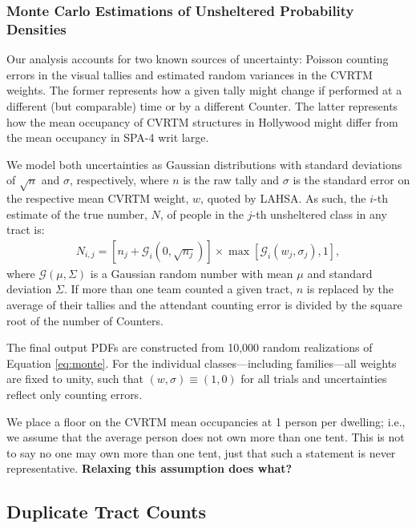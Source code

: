\documentclass[11pt,twocolumn]{article}
\def\bfr{\bf\color{red}}
\def\resp{respectively}
\begin{document}
\subsubsection{Monte Carlo Estimations of Unsheltered Probability Densities}
\label{sec:mc}

Our analysis accounts for two known sources of uncertainty: Poisson counting errors in the visual
tallies and estimated random variances in the CVRTM weights. The former represents how a given
tally might change if performed at a different (but comparable) time or by a different Counter. The 
latter represents how the mean occupancy of CVRTM structures in Hollywood might differ from
the mean occupancy in SPA-4 writ large. 

We model both uncertainties as Gaussian distributions with standard deviations of 
$\sqrt{n}$ and $\sigma$, \resp, where $n$ is the raw tally and $\sigma$ is the standard error on the 
respective mean CVRTM weight, $w$, quoted by LAHSA. As such, the $i$-th estimate of the true 
number, $N$, of people in the $j$-th unsheltered class in any tract is:
\begin{multline}\label{eq:monte}
	N_{i,j} = \left[n_{j} + \mathcal{G}_{i}(0,\sqrt{n_{j}})\right]\times\max[\mathcal{G}_{i}(w_{j}, \sigma_{j}),1],
\end{multline}
where $\mathcal{G}(\mu,\Sigma)$ is a Gaussian random number with mean $\mu$ and standard deviation 
$\Sigma$. If more than one team counted a given tract, $n$ is replaced by the average of their tallies 
and the attendant counting error is divided by the square root of the number of Counters.

The final output PDFs are constructed from 10,000 random realizations of Equation \ref{eq:monte}. 
For the individual classes---including families---all weights are 
fixed to unity, such that $(w,\sigma)\equiv(1,0)$ for all trials and uncertainties reflect only 
counting errors.

We place a floor on the CVRTM mean occupancies at 1 person per dwelling; i.e., we assume that the average
person does not own more than one tent. This is not to say no one may own more than one tent, just that
such a statement is never representative. {\bfr Relaxing this assumption does what?} 

\subsection{Duplicate Tract Counts}
\label{sec:dupes}
\end{document}

